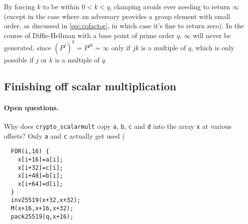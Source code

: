 \documentclass{article}
\begin{document}
By forcing $k$ to be within $0 < k < q$, clamping avoids ever needing to return $\infty$ (except in the case where an adversary provides a group element with small order, as discussed in \autoref{sec:cofactor}, in which case it's fine to return zero).
In the course of Diffie-Hellman with a base point of prime order $q$, $\infty$ will never be generated, since $(P^j)^k = P^{jk} = \infty$ only if $jk$ is a multiple of $q$, which is only possible if $j$ or $k$ is a multiple of $q$.

\subsection{Finishing off scalar multiplication}

\paragraph{Open questions.}
Why does \verb|crypto_scalarmult| copy \verb|a|, \verb|b|, \verb|c| and \verb|d| into the array \verb|x| at various offsets?
Only \verb|a| and \verb|c| actually get used (

\begin{verbatim}
  FOR(i,16) {
    x[i+16]=a[i];
    x[i+32]=c[i];
    x[i+48]=b[i];
    x[i+64]=d[i];
  }
  inv25519(x+32,x+32);
  M(x+16,x+16,x+32);
  pack25519(q,x+16);
\end{verbatim}







\end{document}
